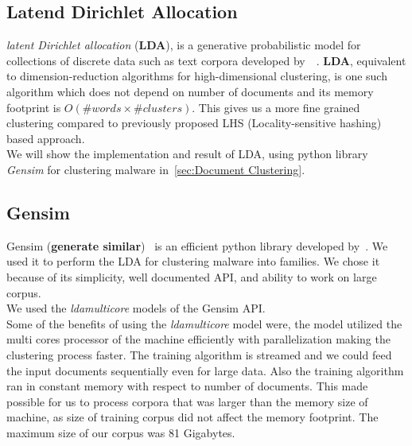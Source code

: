 \subsection{Latend Dirichlet Allocation}
\label{sub:Latend Dirichlet Allocation}
\textit{latent Dirichlet allocation} (\textbf{LDA}), is a generative probabilistic model for collections of discrete data such as text corpora developed by~\citeauthor{Blei}~\cite[LDA]{Blei}.
\textbf{LDA}, equivalent to dimension-reduction algorithms for high-dimensional clustering, is one such algorithm which does not depend on number of documents and its memory footprint is $O(\#words\times \#clusters)$.
This gives us a more fine grained clustering compared to previously proposed LHS (Locality-sensitive hashing) based approach.\\
We will show the implementation and result of LDA, using python library \emph{Gensim} for clustering malware in~\autoref{sec:Document Clustering}.\\
\subsection{Gensim}
\label{sub:Gensim}
Gensim (\textbf{generate similar})~\cite[]{gensim} is an efficient python library developed by~\citeauthor{gensim}.
We used it to perform the LDA for clustering malware into families.
We chose it because of its simplicity, well documented API, and ability to work on large corpus.\\
We used the \emph{ldamulticore}\cite[]{ldamulticore}  models of the Gensim API.\\
Some of the benefits of using the \emph{ldamulticore} model were, the model utilized the multi cores processor of the machine efficiently with parallelization making the clustering process faster.
The training algorithm is streamed and we could feed the input documents sequentially even for large data.
Also the training algorithm ran in constant memory with respect to number of documents.
This made possible for us to process corpora that was larger than the memory size of machine, as size of training corpus did not affect the memory footprint.
The maximum size of our corpus was 81 Gigabytes.

